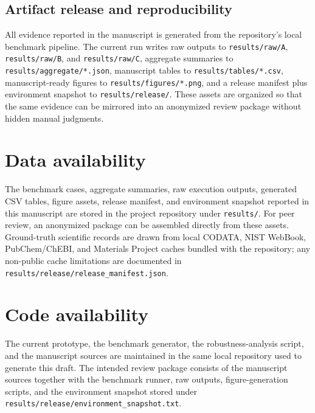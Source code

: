 \documentclass[12pt]{article}
\begin{document}
\subsection{Artifact release and reproducibility}

All evidence reported in the manuscript is generated from the repository's local benchmark pipeline. The current run writes raw outputs to \texttt{results/raw/A}, \texttt{results/raw/B}, and \texttt{results/raw/C}, aggregate summaries to \texttt{results/aggregate/*.json}, manuscript tables to \texttt{results/tables/*.csv}, manuscript-ready figures to \texttt{results/figures/*.png}, and a release manifest plus environment snapshot to \texttt{results/release/}. These assets are organized so that the same evidence can be mirrored into an anonymized review package without hidden manual judgments.

\section*{Data availability}

The benchmark cases, aggregate summaries, raw execution outputs, generated CSV tables, figure assets, release manifest, and environment snapshot reported in this manuscript are stored in the project repository under \texttt{results/}. For peer review, an anonymized package can be assembled directly from these assets. Ground-truth scientific records are drawn from local CODATA, NIST WebBook, PubChem/ChEBI, and Materials Project caches bundled with the repository; any non-public cache limitations are documented in \texttt{results/release/release\_manifest.json}.

\section*{Code availability}

The current prototype, the benchmark generator, the robustness-analysis script, and the manuscript sources are maintained in the same local repository used to generate this draft. The intended review package consists of the manuscript sources together with the benchmark runner, raw outputs, figure-generation scripts, and the environment snapshot stored under \texttt{results/release/environment\_snapshot.txt}.
\end{document}
